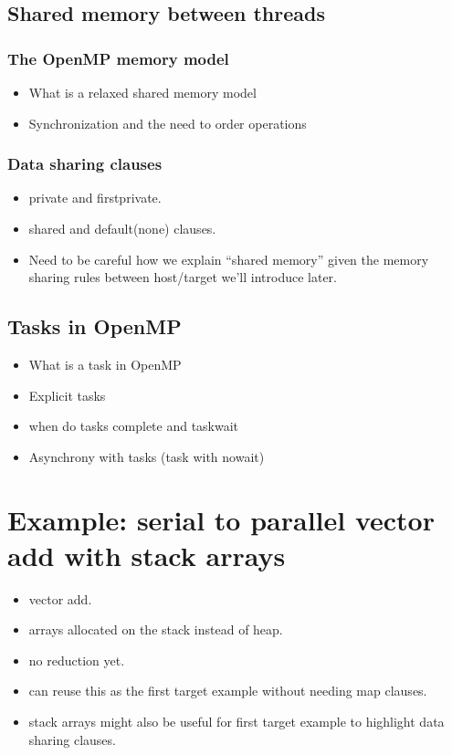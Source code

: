 \subsection{Shared memory between threads}
\subsubsection{The OpenMP memory model}
\begin{itemize}
  \item What is a relaxed shared memory model
  \item Synchronization and the need to order operations
\end{itemize}
\subsubsection{Data sharing clauses}
\begin{itemize}
  \item private and firstprivate.
  \item shared and default(none) clauses.
  \item Need to be careful how we explain “shared memory” given the memory sharing rules between host/target we’ll introduce later.
\end{itemize}

\subsection{Tasks in OpenMP}
\begin{itemize}
   \item What is a task in OpenMP
   \item Explicit tasks 
   \item when do tasks complete and taskwait
   \item Asynchrony with tasks (task with nowait)
\end{itemize}

\section{Example: serial to parallel vector add with stack arrays}
\begin{itemize}
  \item vector add.
  \item arrays allocated on the stack instead of heap.
  \item no reduction yet.
  \item can reuse this as the first target example without needing map clauses.
  \item stack arrays might also be useful for first target example to highlight data sharing clauses.
\end{itemize}

